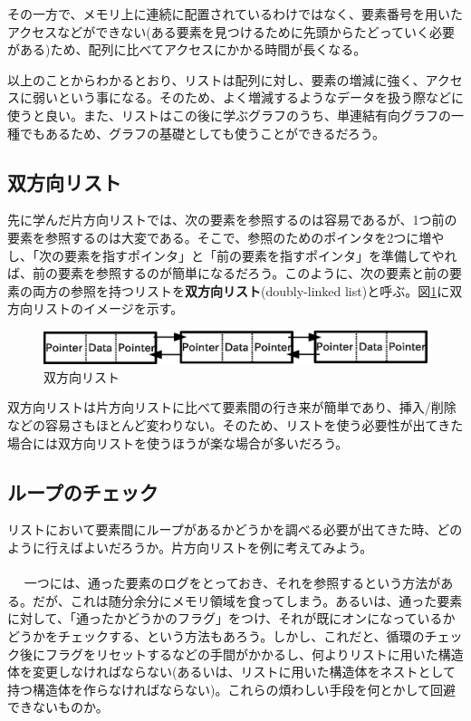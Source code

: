 その一方で、メモリ上に連続に配置されているわけではなく、要素番号を用いたアクセスなどができない(ある要素を見つけるために先頭からたどっていく必要がある)ため、配列に比べてアクセスにかかる時間が長くなる。

以上のことからわかるとおり、リストは配列に対し、要素の増減に強く、アクセスに弱いという事になる。そのため、よく増減するようなデータを扱う際などに使うと良い。また、リストはこの後に学ぶグラフのうち、単連結有向グラフの一種でもあるため、グラフの基礎としても使うことができるだろう。
  
\subsection{双方向リスト}
先に学んだ片方向リストでは、次の要素を参照するのは容易であるが、1つ前の要素を参照するのは大変である。そこで、参照のためのポインタを2つに増やし、「次の要素を指すポインタ」と「前の要素を指すポインタ」を準備してやれば、前の要素を参照するのが簡単になるだろう。このように、次の要素と前の要素の両方の参照を持つリストを\textbf{双方向リスト}(doubly-linked list)と呼ぶ。図\ref{Doubly}に双方向リストのイメージを示す。
\begin{figure}[htb]
\centering
\includegraphics[width=0.95\linewidth,keepaspectratio]{fig13_2.eps}
\caption{双方向リスト}\label{Doubly}
\end{figure}

双方向リストは片方向リストに比べて要素間の行き来が簡単であり、挿入/削除などの容易さもほとんど変わりない。そのため、リストを使う必要性が出てきた場合には双方向リストを使うほうが楽な場合が多いだろう。

\subsection{ループのチェック}
リストにおいて要素間にループがあるかどうかを調べる必要が出てきた時、どのように行えばよいだろうか。片方向リストを例に考えてみよう。
\\ \\　
一つには、通った要素のログをとっておき、それを参照するという方法がある。だが、これは随分余分にメモリ領域を食ってしまう。あるいは、通った要素に対して、「通ったかどうかのフラグ」をつけ、それが既にオンになっているかどうかをチェックする、という方法もあろう。しかし、これだと、循環のチェック後にフラグをリセットするなどの手間がかかるし、何よりリストに用いた構造体を変更しなければならない(あるいは、リストに用いた構造体をネストとして持つ構造体を作らなければならない)。これらの煩わしい手段を何とかして回避できないものか。


